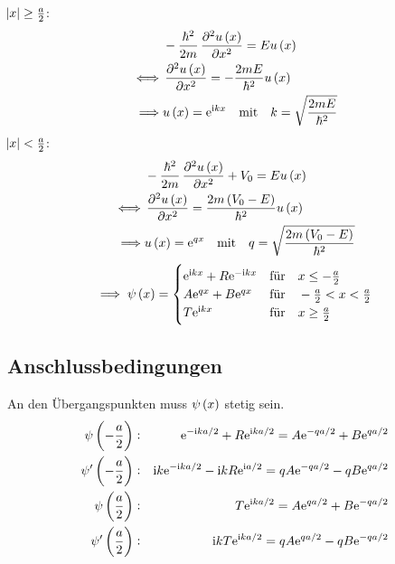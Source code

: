 $\abs{x} \geq \frac{a}{2}$:
\begin{align*}
 &-\frac{\hbar^2}{2m} \dpd[2]{u\del{x}}{x} = E u\del{x}\\
 \iff & \dpd[2]{u\del{x}}{x} = - \frac{2mE}{\hbar^2} u\del{x}\\
 \implies &u\del{x} = \ee^{\ii kx} \quad \text{mit} \quad k = \sqrt{\frac{2mE}{\hbar^2}}
\end{align*}
$\abs{x} < \frac{a}2$:
\begin{align*}
 &-\frac{\hbar^2}{2m} \dpd[2]{u\del{x}}{x} + V_0 = E u\del{x}\\
 \iff & \dpd[2]{u\del{x}}{x} = \frac{2m\del{V_0 - E}}{\hbar^2} u\del{x}\\
 \implies &u\del{x} = \ee^{qx} \quad \text{mit} \quad q = \sqrt{\frac{2m\del{V_0-E}}{\hbar^2}}
\end{align*}
\begin{align*}
 \implies \psi\del x = 
 \begin{cases}
  \ee^{\ii kx} + R\ee^{-\ii kx} & \text{für} \quad x \leq - \frac a2\\
  A\ee^{qx} + B\ee^{qx} & \text{für} \quad -\frac a2 < x < \frac a2\\
  T\ee^{\ii kx} & \text{für} \quad x \geq \frac a2
 \end{cases}
\end{align*}

\subsection{Anschlussbedingungen}

An den Übergangspunkten muss $\psi\del x$ stetig sein.
\begin{align*}
 \psi\del{-\frac a2}&: &\ee^{-\ii k a / 2} + R\ee^{\ii k a / 2} = A\ee^{-qa / 2} + B\ee^{qa / 2}\\
 \psi'\del{-\frac a2}&: &\ii k \ee^{-\ii k a / 2} - \ii k R \ee^{\ii a / 2} = qA\ee^{-qa / 2} - qB\ee^{qa / 2}\\
 \psi\del{\frac a2}&: & T\ee^{\ii ka/2} = A\ee^{q a/2} + B\ee^{-q a/2}\\
 \psi'\del{\frac a2}&: & \ii kT\ee^{\ii ka/2} = qA\ee^{q a/2} - q B\ee^{-q a/2}
\end{align*}

